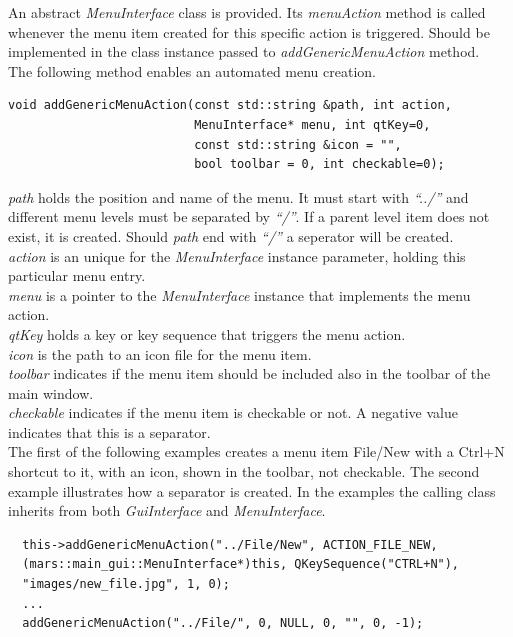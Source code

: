 \documentclass{article}
\begin{document}
An abstract \emph{MenuInterface} class is provided. Its \emph{menuAction} method is called whenever the menu item created for this specific action is triggered. Should be implemented in the class instance passed to \emph{addGenericMenuAction} method. \\

The following method enables an automated menu creation.

\begin{lstlisting}
void addGenericMenuAction(const std::string &path, int action,
                          MenuInterface* menu, int qtKey=0,
                          const std::string &icon = "",
                          bool toolbar = 0, int checkable=0);
\end{lstlisting}

\emph{path} holds the position and name of the menu. It must start with \emph{``../''} and different menu levels must be separated by \emph{``/''}. If a parent level item does not exist, it is created. Should \emph{path} end with \emph{``/''} a seperator will be created. \\

\emph{action} is an unique for the \emph{MenuInterface} instance parameter, holding this particular menu entry.\\

\emph{menu} is a pointer to the \emph{MenuInterface} instance that implements the menu action.\\

\emph{qtKey} holds a key or key sequence that triggers the menu action.\\

\emph{icon} is the path to an icon file for the menu item.\\

\emph{toolbar} indicates if the menu item should be included also in the toolbar of the main window.\\

\emph{checkable} indicates if the menu item is checkable or not. A negative value indicates that this is a separator.\\

The first of the following examples creates a menu item File/New with a Ctrl+N shortcut to it, with an icon, shown in the toolbar, not checkable. The second example illustrates how a separator is created. In the examples the calling class inherits from both \emph{GuiInterface} and \emph{MenuInterface}.

\begin{lstlisting}
  this->addGenericMenuAction("../File/New", ACTION_FILE_NEW, 
  (mars::main_gui::MenuInterface*)this, QKeySequence("CTRL+N"), 
  "images/new_file.jpg", 1, 0);
  ...
  addGenericMenuAction("../File/", 0, NULL, 0, "", 0, -1);
\end{lstlisting}
\end{document}
